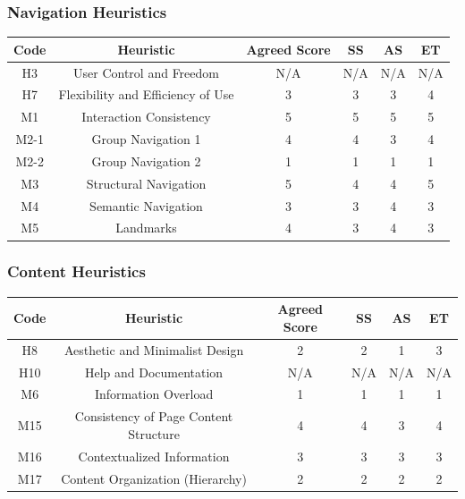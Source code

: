 \documentclass[11pt]{article} %
\begin{document}
\subsubsection{Navigation Heuristics}
\begin{center}
    \begin{tabular}{|c|c|c|c|c|c|}
        \hline
        \textbf{Code}  & \textbf{Heuristic} & \textbf{Agreed Score} & \textbf{SS} & \textbf{AS} & \textbf{ET} \\
        \hline
        H3 & User Control and Freedom & N/A & N/A & N/A & N/A \\
        \hline
        H7 & Flexibility and Efficiency of Use & 3 & 3 & 3 & 4 \\
        \hline
        M1 & Interaction Consistency & 5 & 5 & 5 & 5 \\
        \hline
        M2-1 & Group Navigation 1 & 4 & 4 & 3 & 4 \\
        \hline
        M2-2 & Group Navigation 2 & 1 & 1 & 1 & 1 \\
        \hline
        M3 & Structural Navigation & 5 & 4 & 4 & 5 \\
        \hline
        M4 & Semantic Navigation & 3 & 3 & 4 & 3 \\
        \hline
        M5 & Landmarks & 4 & 3 & 4 & 3 \\
        \hline
    \end{tabular}
\end{center}

\subsubsection{Content Heuristics}
\begin{center}
    \begin{tabular}{|c|c|c|c|c|c|}
        \hline
        \textbf{Code}  & \textbf{Heuristic} & \textbf{Agreed Score} & \textbf{SS} & \textbf{AS} & \textbf{ET} \\
        \hline
        H8 & Aesthetic and Minimalist Design & 2 & 2 & 1 & 3 \\
        \hline
        H10 & Help and Documentation & N/A & N/A & N/A & N/A \\
        \hline
        M6 & Information Overload & 1 & 1 & 1 & 1 \\
        \hline
        M15 & Consistency of Page Content Structure & 4 & 4 & 3 & 4 \\
        \hline
        M16 & Contextualized Information & 3 & 3 & 3 & 3 \\
        \hline
        M17 & Content Organization (Hierarchy) & 2 & 2 & 2 & 2 \\
        \hline
    \end{tabular}
\end{center}
\end{document}
